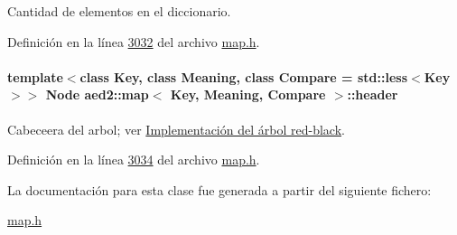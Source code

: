 Cantidad de elementos en el diccionario. 



Definición en la línea \hyperlink{map_8h_source_l03032}{3032} del archivo \hyperlink{map_8h_source}{map.\+h}.

\paragraph[{\texorpdfstring{header}{header}}]{\setlength{\rightskip}{0pt plus 5cm}template$<$class Key, class Meaning, class Compare = std\+::less$<$\+Key$>$$>$ {\bf Node} {\bf aed2\+::map}$<$ Key, Meaning, Compare $>$\+::header\hspace{0.3cm}{\ttfamily [private]}}\hypertarget{classaed2_1_1map_a92d93f905c8ad73fba18fdc7e8915cce_a92d93f905c8ad73fba18fdc7e8915cce}{}\label{classaed2_1_1map_a92d93f905c8ad73fba18fdc7e8915cce_a92d93f905c8ad73fba18fdc7e8915cce}


Cabeceera del arbol; ver \hyperlink{Implementacion}{Implementación del árbol red-\/black}. 



Definición en la línea \hyperlink{map_8h_source_l03034}{3034} del archivo \hyperlink{map_8h_source}{map.\+h}.



La documentación para esta clase fue generada a partir del siguiente fichero\+:\begin{DoxyCompactItemize}
\item 
\hyperlink{map_8h}{map.\+h}\end{DoxyCompactItemize}
